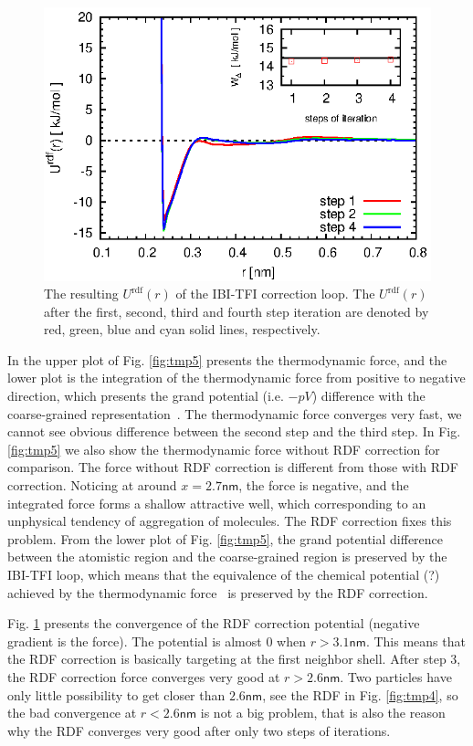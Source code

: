 \documentclass[aps,pre,preprint,unsortedaddress]{revtex4}
\begin{document}
\begin{figure}
  \centering
  \includegraphics{fig.3/force-rdf.eps}
  \caption{The resulting $U^{\textrm{rdf}}(r)$ of the IBI-TFI
    correction loop.  The $U^{\textrm{rdf}}(r)$ after the first,
    second, third and fourth step iteration are denoted by red, green,
    blue and cyan solid lines, respectively.  }
  \label{fig:tmp6}
\end{figure}

In the upper plot of Fig. \ref{fig:tmp5} presents the thermodynamic
force, and the lower plot is the integration of
the thermodynamic force from positive to negative direction, which
presents the grand potential (i.e. $-pV$) difference with the
coarse-grained representation~\cite{fritsch2011grand}.
The thermodynamic force converges very
fast, we cannot see obvious difference between the second
step and the third step.  In Fig. \ref{fig:tmp5} we also show the
thermodynamic force without RDF correction for comparison. The force
without RDF correction is different from those with RDF
correction. Noticing at around $x=2.7 \textsf{nm}$, the force is
negative, and the integrated force forms a shallow attractive well,
which corresponding to an unphysical tendency of aggregation of molecules. The RDF
correction fixes this problem. From the lower plot of
Fig. \ref{fig:tmp5}, the grand potential difference between the
atomistic region and the coarse-grained region is preserved by the
IBI-TFI loop, which means that the equivalence of the chemical
potential (?) achieved by the thermodynamic
force~\cite{fritsch2011grand} is preserved by the RDF correction.

Fig. \ref{fig:tmp6} presents the convergence of the RDF correction
potential (negative gradient is the force). The potential is almost 0
when $r > 3.1\textsf{nm}$. This means that the RDF correction is
basically targeting at the first neighbor shell. After step 3, the RDF
correction force converges very good at $r > 2.6\textsf{nm}$. Two
particles have only little possibility to get closer than $2.6\textsf{nm}$,
see the RDF in Fig. \ref{fig:tmp4}, so the bad convergence at $r <
2.6\textsf{nm}$ is not a big problem, that is also the reason why the
RDF converges very good after only two steps of iterations.
\end{document}
